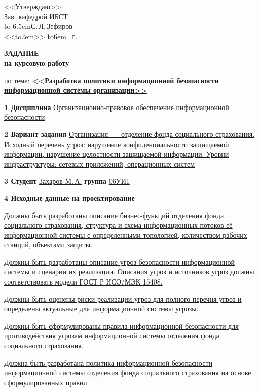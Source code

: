 \begin{singlespace}
\hfill\parbox{6.5cm}{<<Утверждаю>>\\
  Зав. кафедрой ИБСТ\\
  \hbox to 6.5cm{\hrulefill С.\,Л.\,Зефиров}\\
  \def\hrf#1{\hbox to#1{\hrulefill}}
  <<\hrf{2em}>> \hrf{6em} \the\year~г.}	
	
\begin{center}\textbf{\normalfont\bfseries\large ЗАДАНИЕ}\\\textbf{на
    курсовую работу}\end{center}

по теме: \textbf{\uline{<<Разработка политики информационной
    безопас\-ности инфор\-мационной системы организации>>\hfill\quad}}

  \textbf{1 Дисциплина} \uline{\qquad Организационно-правовое обеспечение
    ин\-формационной безопасности\hfill}

  \textbf{2 Вариант задания} \uline{\qquad Организация~--- отделение фонда
    соци\-ального страхования. Исходный перечень угроз: нарушение
    конфиден\-циальности защищаемой информации, нарушение целостности
    защи\-щаемой информации. Уровни инфраструктуры: сетевых
    приложений, операционных систем\hfill}

  \textbf{3 Студент} \uline{\qquad Захаров М.\,А.\qquad }
  \textbf{группа} \uline{\qquad 06УИ1\hfill}

  \textbf{4 Исходные данные на проектирование}

  \uline{Должны быть разработаны описание бизнес-функций отделения
    фонда социального страхования, структура и схема информационных
    потоков её информационной системы с определенными топологией,
    количеством рабочих станций, объектами защиты.\hfill\quad}

  \uline{Должны быть разработаны описание угроз безопасности
    инфор\-мационной системы и сценарии их реализации. Описания угроз
    и источников угроз должны соответствовать модели ГОСТ Р ИСО/МЭК
    15408.\hfill\quad}

  \uline{Должны быть оценены риски реализации угроз для полного
    перечня угроз и определены актуальные для информационной системы
    угрозы.\hfill\quad}

  \uline{Должны быть сформулированы правила информационной
    безо\-пасности для противодействия угрозам информационной системы
    отде\-ления фонда социального страхования.\hfill\quad}

  \uline{Должна быть разработана политика информационной
    безопас\-ности информационной системы отделения фонда социального
    страхо\-вания на основе сформулированных правил.\hfill\quad}


\end{singlespace}
